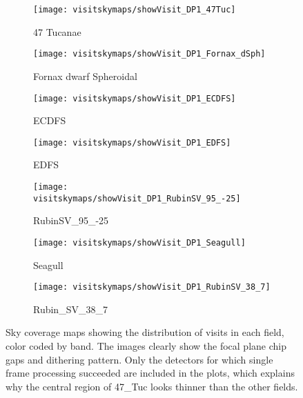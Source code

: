 \begin{figure*}[ht]
    \centering
    \begin{subfigure}[b]{0.22\textwidth}
        \centering
        \texttt{[image: visitskymaps/showVisit\_DP1\_47Tuc]}
        \caption{47 Tucanae}
    \end{subfigure}\hfill
    \begin{subfigure}[b]{0.22\textwidth}
        \centering
        \texttt{[image: visitskymaps/showVisit\_DP1\_Fornax\_dSph]}
        \caption{Fornax dwarf Spheroidal}
    \end{subfigure}\hfill
    \begin{subfigure}[b]{0.22\textwidth}
        \centering
        \texttt{[image: visitskymaps/showVisit\_DP1\_ECDFS]}
        \caption{ECDFS}
    \end{subfigure}
    \begin{subfigure}[b]{0.22\textwidth}
        \centering
        \texttt{[image: visitskymaps/showVisit\_DP1\_EDFS]}
        \caption{EDFS}
    \end{subfigure}\hfill
    \vspace{1em}

    \begin{subfigure}[b]{0.22\textwidth}
      \centering
        \texttt{[image: visitskymaps/showVisit\_DP1\_RubinSV\_95\_-25]}
        \caption{RubinSV\_95\_-25}
    \end{subfigure}\hfill
    \begin{subfigure}[b]{0.22\textwidth}
        \centering
        \texttt{[image: visitskymaps/showVisit\_DP1\_Seagull]}
        \caption{Seagull}
    \end{subfigure}\hfill
    \begin{subfigure}[b]{0.22\textwidth}
        \centering
        \texttt{[image: visitskymaps/showVisit\_DP1\_RubinSV\_38\_7]}
        \caption{Rubin\_SV\_38\_7}
    \end{subfigure}\hfill
    \begin{subfigure}[b]{0.22\textwidth}
        \caption*{}
    \end{subfigure}
     \vspace{1em}
    \caption{Sky coverage maps showing the distribution of visits in each field, color coded by band. The images clearly show the focal plane chip gaps and dithering pattern. Only the detectors for which single frame processing succeeded are included in the plots, which explains why the central region of 47\_Tuc looks thinner than the other fields. }
    \label{fig:dp1_fields_coverage}
\end{figure*}


